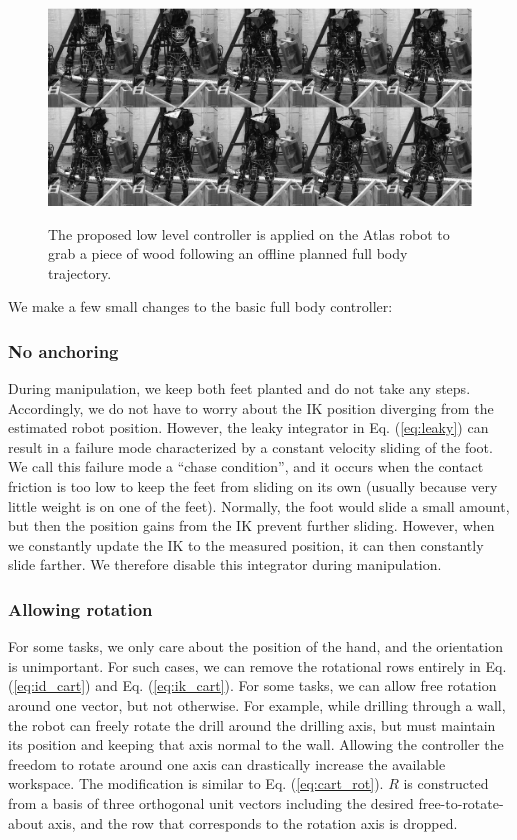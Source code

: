 \documentclass{ws-ijhr}
\newcommand{\eref}[1] {Eq. (\ref{#1})}
\begin{document}
\begin{figure} 
  \begin{center}
    {\includegraphics[width=1\textwidth]{images/debris.eps}}
    \caption{The proposed low level controller is applied on the Atlas robot 
      to grab a piece of wood following an offline planned full body trajectory.}
			\label{fig:manip}
  \end{center}
\end{figure}  
 
We make a few small changes to the basic full body controller:
\subsubsection{No anchoring}
During manipulation, we keep both feet planted and do not take any steps. 
Accordingly, we do not have to worry about the IK position diverging from the 
estimated robot position. However, the leaky integrator in \eref{eq:leaky} 
can result in a failure mode characterized by a constant velocity sliding of 
the foot. We call this failure mode a ``chase condition'', and it occurs when 
the contact friction is too low to keep the feet from sliding on its own 
(usually because very little weight is on one of the feet). Normally, the 
foot would slide a small amount, but then the position gains from the IK 
prevent further sliding. However, when we constantly update the IK to the 
measured position, it can then constantly slide farther. We therefore 
disable this integrator during manipulation.
\label{sec:chase_condition}

\subsubsection{Allowing rotation}
For some tasks, we only care about the position of the hand, and the 
orientation is unimportant. For such cases, we can remove the rotational
rows entirely in \eref{eq:id_cart} and \eref{eq:ik_cart}. For some tasks, we can allow free rotation around one 
vector, but not otherwise. For example, while drilling through a wall, the 
robot can freely rotate the drill around the drilling axis, but must 
maintain its position and keeping that axis normal to the wall. Allowing 
the controller the freedom to rotate around one axis can drastically 
increase the available workspace. The modification is similar to
\eref{eq:cart_rot}. $R$ is constructed from a basis of three orthogonal 
unit vectors including the desired free-to-rotate-about axis, and the row 
that corresponds to the rotation axis is dropped. 
\end{document}
